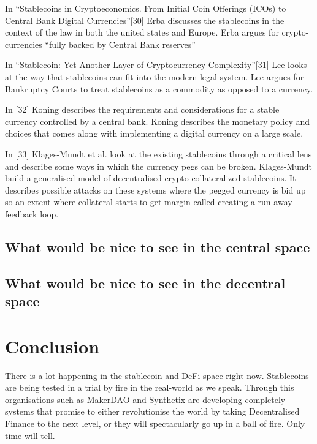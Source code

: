 \documentclass[english,]{IEEEtran}
\begin{document}
In ``Stablecoins in Cryptoeconomics. From Initial Coin Offerings (ICOs)
to Central Bank Digital Currencies''{[}30{]} Erba discusses the
stablecoins in the context of the law in both the united states and
Europe. Erba argues for crypto-currencies ``fully backed by Central Bank
reserves''

In ``Stablecoin: Yet Another Layer of Cryptocurrency
Complexity''{[}31{]} Lee looks at the way that stablecoins can fit into
the modern legal system. Lee argues for Bankruptcy Courts to treat
stablecoins as a commodity as opposed to a currency.

In {[}32{]} Koning describes the requirements and considerations for a
stable currency controlled by a central bank. Koning describes the
monetary policy and choices that comes along with implementing a digital
currency on a large scale.

In {[}33{]} Klages-Mundt et al. look at the existing stablecoins through
a critical lens and describe some ways in which the currency pegs can be
broken. Klages-Mundt build a generalised model of decentralised
crypto-collateralized stablecoins. It describes possible attacks on
these systems where the pegged currency is bid up so an extent where
collateral starts to get margin-called creating a run-away feedback
loop.

\subsection{What would be nice to see in the central
space}\label{what-would-be-nice-to-see-in-the-central-space}

\subsection{What would be nice to see in the decentral
space}\label{what-would-be-nice-to-see-in-the-decentral-space}

\section{Conclusion}\label{conclusion}

There is a lot happening in the stablecoin and DeFi space right now.
Stablecoins are being tested in a trial by fire in the real-world as we
speak. Through this organisations such as MakerDAO and Synthetix are
developing completely systems that promise to either revolutionise the
world by taking Decentralised Finance to the next level, or they will
spectacularly go up in a ball of fire. Only time will tell.
\end{document}
